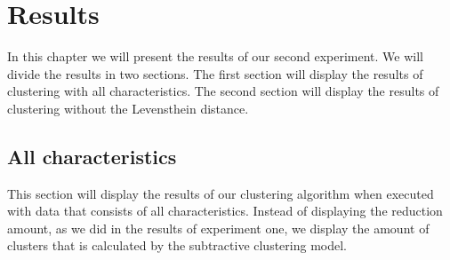 \documentclass[../../main]{subfiles}
\begin{document}
\clearpage
\section{Results}
\label{ch:results_rq2}
In this chapter we will present the results of our second experiment.
We will divide the results in two sections. 
The first section will display the results of clustering with all characteristics.
The second section will display the results of clustering without the Levensthein distance.

\subsection{All characteristics}
This section will display the results of our clustering algorithm when executed with data that consists of all characteristics. 
Instead of displaying the reduction amount, as we did in the results of experiment one, we display the amount of clusters that is calculated by the subtractive clustering model.
\end{document}
